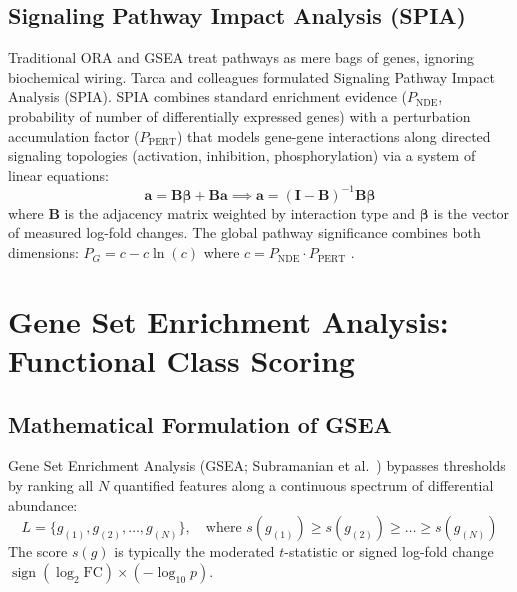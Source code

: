 \documentclass[11pt,oneside]{book}
\begin{document}
\subsection{Signaling Pathway Impact Analysis (SPIA)}
Traditional ORA and GSEA treat pathways as mere bags of genes, ignoring biochemical wiring. Tarca and colleagues \cite{tarca2009signaling} formulated Signaling Pathway Impact Analysis (SPIA). SPIA combines standard enrichment evidence ($P_{\text{NDE}}$, probability of number of differentially expressed genes) with a perturbation accumulation factor ($P_{\text{PERT}}$) that models gene-gene interactions along directed signaling topologies (activation, inhibition, phosphorylation) via a system of linear equations:
\begin{equation}
\mathbf{a} = \mathbf{B} \boldsymbol{\beta} + \mathbf{B} \mathbf{a} \implies \mathbf{a} = (\mathbf{I} - \mathbf{B})^{-1} \mathbf{B} \boldsymbol{\beta}
\end{equation}
where $\mathbf{B}$ is the adjacency matrix weighted by interaction type and $\boldsymbol{\beta}$ is the vector of measured log-fold changes. The global pathway significance combines both dimensions: $P_G = c - c \ln(c)$ where $c = P_{\text{NDE}} \cdot P_{\text{PERT}}$ \cite{tarca2009signaling}.

\section{Gene Set Enrichment Analysis: Functional Class Scoring}

\subsection{Mathematical Formulation of GSEA}

Gene Set Enrichment Analysis (GSEA; Subramanian et al.~\cite{subramanian2005gene}) bypasses thresholds by ranking all $N$ quantified features along a continuous spectrum of differential abundance:
\begin{equation}
L = \{g_{(1)}, g_{(2)}, \dots, g_{(N)}\}, \quad \text{where } s(g_{(1)}) \ge s(g_{(2)}) \ge \dots \ge s(g_{(N)})
\end{equation}
The score $s(g)$ is typically the moderated $t$-statistic or signed log-fold change $\operatorname{sign}(\log_2 \text{FC}) \times (-\log_{10} p)$.
\end{document}

